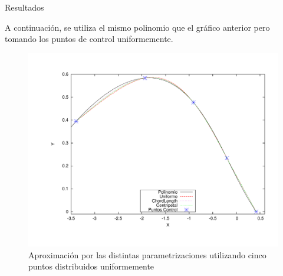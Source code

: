 \begin{section}{Resultados}
	\VSP
	
	A continuación, se utiliza el mismo polinomio que el gráfico anterior pero tomando los puntos de control uniformemente.
	
	\begin{figure}[H]
	  \centering
		\includegraphics[width=14cm]{graficos/5p_u.pdf}
	  \caption{Aproximación por las distintas parametrizaciones utilizando cinco puntos distribuidos uniformemente}
	  \label{fig:5p_u}
	\end{figure}
	
	\VSP
	
\end{section}
